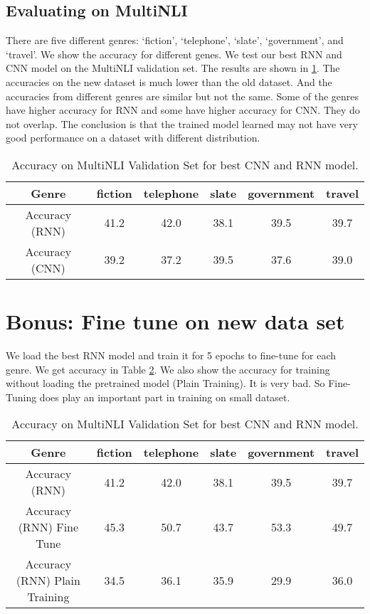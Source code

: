 \documentclass[10pt,a4paper]{article}
\begin{document}
\subsection{Evaluating on MultiNLI}
There are five different genres: `fiction', `telephone', `slate', `government', and `travel'. We show the accuracy for different genes. We test our best RNN and CNN model on the MultiNLI validation set. The results are shown in \ref{tab: val}. The accuracies on the new dataset is much lower than the old dataset. And the accuracies from different genres are similar but not the same. Some of the genres have higher accuracy for RNN and some have higher accuracy for CNN. They do not overlap. The conclusion is that the trained model learned may not have very good performance on a dataset with different distribution. 
\begin{table}[!ht]
\centering
\begin{tabular}{|c|c|c|c|c|c|}
\hline
Genre & fiction & telephone & slate & government & travel\\ \hline
Accuracy (RNN) & 41.2 & 42.0 & 38.1 & 39.5 & 39.7 \\ \hline
Accuracy (CNN) & 39.2 & 37.2 & 39.5 & 37.6 & 39.0 \\ \hline
\end{tabular}
\caption{\label{tab: val}Accuracy on MultiNLI Validation Set for best CNN and RNN model.}
\end{table}
\clearpage
\section{Bonus: Fine tune on new data set}
We load the best RNN model and train it for 5 epochs to fine-tune for each genre. We get accuracy in Table \ref{tab: ft}. We also show the accuracy for training without loading the pretrained model (Plain Training). It is very bad. So Fine-Tuning does play an important part in training on small dataset.
\begin{table}[!ht]
\centering
\begin{tabular}{|c|c|c|c|c|c|}
\hline
Genre & fiction & telephone & slate & government & travel\\ \hline
Accuracy (RNN) & 41.2 & 42.0 & 38.1 & 39.5 & 39.7 \\ \hline
Accuracy (RNN) Fine Tune & 45.3 & 50.7 & 43.7 & 53.3 & 49.7 \\ \hline
Accuracy (RNN) Plain Training & 34.5 & 36.1 & 35.9 & 29.9& 36.0 \\ \hline
\end{tabular}
\caption{\label{tab: ft}Accuracy on MultiNLI Validation Set for best CNN and RNN model.}
\end{table}
\end{document}
